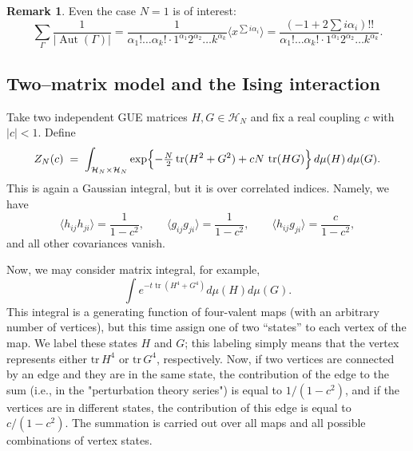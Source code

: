 \documentclass[letterpaper,11pt,oneside,reqno]{article}
\numberwithin{equation}{section}
\theoremstyle{definition}
\newtheorem{remark}[proposition]{Remark}
\begin{document}
\begin{remark}
	Even the case $N=1$ is of interest:
	\begin{equation*}
		\sum_{\Gamma}\frac{1}{|\operatorname{Aut}(\Gamma)|}
		=
		\frac{1}{\alpha_1!\ldots \alpha_k!\cdot 1^{\alpha_1}2^{\alpha_2}\ldots k^{\alpha_k}}
		\langle x^{\sum i\alpha_i} \rangle =
		\frac{\left( -1+2\sum i\alpha_i \right)!!}
		{\alpha_1!\ldots \alpha_k!\cdot 1^{\alpha_1}2^{\alpha_2}\ldots k^{\alpha_k}}.
	\end{equation*}
\end{remark}


\subsection{Two–matrix model and the Ising interaction}
\label{subsec:ising}

Take two independent GUE matrices
$H,G\in\mathcal H_N$ and fix a real coupling $c$ with
$|c|<1$.
Define
\[
   Z_N(c)\;=\;
   \int_{\mathcal H_N\times\mathcal H_N}
        \exp\Bigl\{
            -\tfrac{N}{2}\operatorname{tr}(H^{2}+G^{2})
            +cN\,\operatorname{tr}(HG)
          \Bigr\}\,d\mu(H)\,d\mu(G).
\]
This is again a Gaussian integral, but it is over correlated
indices. Namely, we have
\begin{equation*}
	\langle h_{ij}h_{ji} \rangle =\frac{1}{1-c^2},\qquad 
	\langle g_{ij}g_{ji} \rangle =\frac{1}{1-c^2},\qquad
	\langle h_{ij}g_{ji} \rangle =\frac{c}{1-c^2},
\end{equation*}
and all other covariances vanish.

Now, we may consider matrix integral, for example,
\begin{equation*}
	\int e^{-t\operatorname{tr}\left( H^4+G^4 \right)}d\mu(H)d\mu(G).
\end{equation*}
This integral is a generating function of four-valent maps (with an arbitrary number of vertices), but this time assign one of two ``states'' to each vertex of the map. We label these states $H$ and $G$; this labeling simply means that the vertex represents either $\text{tr}\, H^4$ or $\text{tr}\, G^4$, respectively. Now, if two vertices are connected by an edge and they are in the same state, the contribution of the edge to the sum (i.e., in the "perturbation theory series") is equal to $1 / (1 - c^2)$, and if the vertices are in different states, the contribution of this edge is equal to $c / (1 - c^2)$. The summation is carried out over all maps and all possible combinations of vertex states.
\end{document}
